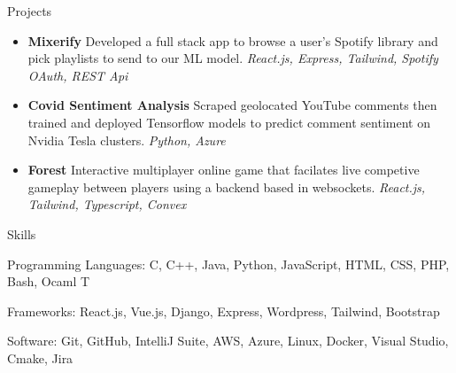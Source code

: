 \documentclass[]{mcdowellcv}
\begin{document}
\begin{cvsection}{Projects}
	\begin{cvsubsection}{}{}{}
		\begin{itemize}
			\setlength\itemsep{3pt}
			\item \textbf{Mixerify} Developed a full stack app to browse a user's Spotify library and pick playlists to send to our ML model. \textit{React.js, Express, Tailwind, Spotify OAuth, REST Api}
			\item \textbf{Covid Sentiment Analysis}  Scraped geolocated YouTube comments then trained and deployed Tensorflow models to predict comment sentiment on Nvidia Tesla clusters. \textit{Python, Azure}
			\item \textbf{Forest} Interactive multiplayer online game that facilates live competive gameplay between players using a backend based in websockets. \textit{React.js, Tailwind, Typescript, Convex}
		\end{itemize}
	\end{cvsubsection}
\end{cvsection}
\begin{cvsection}{Skills}
	\begin{cvsubsection}{}{}{}
		\begin{itemize}
			\item Programming Languages:  C, C++, Java, Python, JavaScript, HTML, CSS, PHP, Bash, Ocaml
			\ifx\WEB T{\item Frameworks: React.js, Vue.js, Django, Express, Wordpress, Tailwind, Bootstrap}\fi
			\item Software:  Git, GitHub, IntelliJ Suite, AWS, Azure, Linux, Docker, Visual Studio, Cmake, Jira
		\end{itemize}
	\end{cvsubsection}
\end{cvsection}
\end{document}
